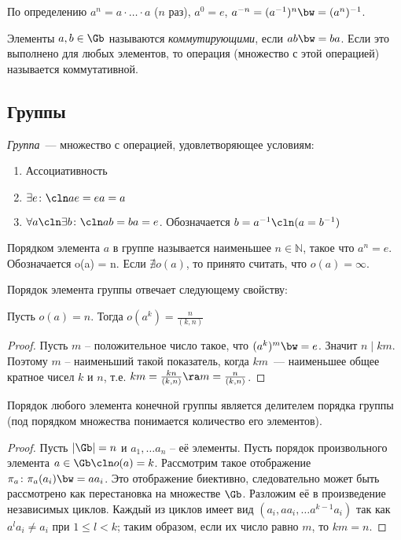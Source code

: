 \begin{df}
  По определению $a^n=a\cdot\dots\cdot a$ ($n$ раз), $a^0=e$, $a^{-n}=(a^{-1})^n\bw=(a^n)^{-1}$.
\end{df}
\begin{df}
  Элементы $a,b\in\Gb$ называются \emph{коммутирующими}, если $ab\bw=ba$. Если это выполнено для любых элементов, то операция (множество с этой операцией) называется коммутативной.
\end{df}

\subsection{Группы}

\begin{df}
 \emph{Группа}~--- множество с операцией, удовлетворяющее условиям:
%
 \begin{enumerate}
  \item Ассоциативность
  \item $\exists e\colon\cln ae=ea=a$
  \item $\forall a\cln\exists b\colon\cln ab = ba = e$. Обозначается $b = a^{-1}\cln(a = b^{-1})$
 \end{enumerate}
\end{df}

\begin{df}
Порядком элемента $a$ в группе называется наименьшее $n \in \mathbb N $, такое что $a^n = e$. Обозначается o(a) = n. Если $\nexists o(a)$, то принято считать, что $o(a) = \infty$.
\end{df}

Порядок элемента группы отвечает следующему свойству:

\begin{theorem}
Пусть $o(a)=n$. Тогда $o(a^k)=\frac{n}{(k,n)}$
\end{theorem}
\begin{proof}
  Пусть $m$ -- положительное число такое, что $(a^k)^m\bw=e$. Значит $n\mid km$. Поэтому $m$ -- наименьший такой показатель, когда $km$~--- наименьшее общее кратное чисел $k$ и $n$, т.е. $km=\frac{kn}{(k,n)}\ra m=\frac{n}{(k,n)}$.
\end{proof}

\begin{theorem}
  \label{group:chaos}
  Порядок любого элемента конечной группы является делителем порядка группы (под порядком множества понимается количество его элементов).
\end{theorem}
\begin{proof}
  Пусть $|\Gb|=n$ и $a_1,\dots a_n$ -- её элементы. Пусть порядок произвольного элемента $a\in\Gb\cln o(a)=k$. Рассмотрим такое отображение $\pi_a\colon \pi_a(a_i)\bw=aa_i$. Это отображение биективно, следовательно может быть рассмотрено как перестановка на множестве $\Gb$. Разложим её в произведение независимых циклов. Каждый из циклов имеет вид $(a_i,aa_i,\dots a^{k-1}a_i)$ так как $a^la_i\ne a_i$ при $1\le l<k$; таким образом, если их число равно $m$, то $km=n$.
\end{proof}

